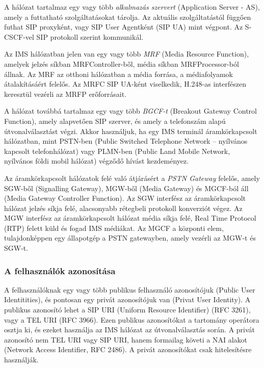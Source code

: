A hálózat tartalmaz egy vagy több \emph{alkalmazás szervert} (Application Server - AS), amely a futtatható szolgáltatásokat tárolja. Az aktuális szolgáltatástól függően futhat SIP proxyként, vagy SIP User Agentként (SIP UA) mint végpont. Az S-CSCF-vel SIP protokoll szerint kommunikál.

Az IMS hálózatban jelen van egy vagy több \emph{MRF} (Media Resource Function), amelyek jelzés síkban MRFController-ből, média síkban MRFProcessor-ból állnak.  Az MRF az otthoni hálózatban a média forrása, a médiafolyamok átalakításáért felelős. Az MRFC SIP UA-ként viselkedik, H.248-as interfészen keresztül vezérli az MRFP erőforrásait.

A hálózat továbbá tartalmaz egy vagy több \emph{BGCF-t} (Breakout Gateway Control Function), amely alapvetően SIP szerver, és amely a telefonszám alapú út\-vo\-nal\-vá\-lasz\-tást végzi. Akkor használjuk, ha egy IMS terminál áramkörkapcsolt hálózatban, mint PSTN-ben (Public Switched Telephone Network – nyílvános kapcsolt telefonhálózat) vagy PLMN-ben (Public Land Mobile Network, nyílvános földi mobil hálózat) végződő hívást kezdeményez.

Az áramkörkapcsolt hálózatok felé való átjárásért a \emph{PSTN Gateway} felelős, a\-mely SGW-ből (Signalling Gateway), MGW-ből (Media Gateway) és MGCF-ból áll (Media Gateway Controller Function). Az SGW interfész az áramkörkapcsolt hálózat jelzés síkja felé, alacsonyabb rétegbeli protokoll konverziót végez. Az MGW interfész az áramkörkapcsolt hálózat média síkja felé, Real Time Protocol (RTP) felett küld és fogad IMS médiákat. Az MGCF a központi elem, tulajdonképpen egy állapotgép a PSTN gatewayben, amely vezérli az MGW-t és SGW-t.

\subsubsection{A felhasználók azonosítása}

A felhasználóknak egy vagy több publikus felhasználó azonosítójuk (Public User Identitities), és pontosan egy privát azonosítójuk van (Privat User Identity). A publikus azonosító lehet a SIP URI (Uniform Resource Identifier) (RFC 3261), vagy a TEL URI (RFC 3966). Ezen publikus azonosítókat a tartomány operátora osztja ki, és ezeket használja az IMS hálózat az útvonalválasztás során. A privát azonosító nem TEL URI vagy SIP URI, hanem formailag követi a NAI alakot (Network Access Identifier, RFC 2486). A privát azonosítókat csak hitelesítésre használják.

